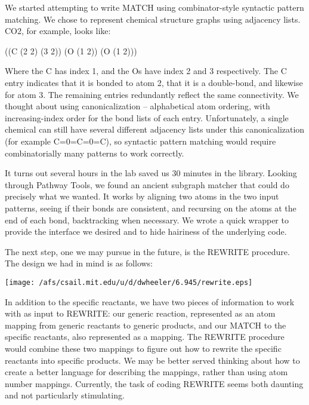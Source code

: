We started attempting to write MATCH using combinator-style syntactic
pattern matching. We chose to represent chemical structure graphs
using adjacency lists. CO2, for example, looks like:

((C (2 2) (3 2)) 
 (O (1 2)) 
 (O (1 2))) 

 Where the C has index 1, and the Os have index 2 and 3 respectively. The C
 entry indicates that it is bonded to atom 2, that it is a double-bond, and
 likewise for atom 3. The remaining entries redundantly reflect the same
 connectivity.  We thought about using canonicalization -- alphabetical
 atom ordering, with increasing-index order for the bond lists of each
 entry. Unfortunately, a single chemical can still have several different
 adjacency lists under this canonicalization (for example C=0=C=0=C), so
 syntactic pattern matching would require combinatorially many patterns to
 work correctly.

It turns out several hours in the lab saved us 30 minutes in the library.
Looking through Pathway Tools, we found an ancient subgraph matcher
that could do precisely what we wanted. It works by aligning two atoms
in the two input patterns, seeing if their bonds are consistent, and
recursing on the atoms at the end of each bond, backtracking when
necessary. We wrote a quick wrapper to provide the interface we desired
and to hide hairiness of the underlying code.

The next step, one we may pursue in the future, is the REWRITE procedure.
The design we had in mind is as follows:

\vspace{.1in}

\begin{center}\texttt{[image: /afs/csail.mit.edu/u/d/dwheeler/6.945/rewrite.eps]}\end{center}

\vspace{.1in}

In addition to the specific reactants, we have two pieces of information
to work with as input to REWRITE: our generic reaction, represented
as an atom mapping from generic reactants to generic products, and
our MATCH to the specific reactants, also represented as a mapping.
The REWRITE procedure would combine these two mappings to figure out
how to rewrite the specific reactants into specific products. We may
be better served thinking about how to create a better language for
describing the mappings, rather than using atom number mappings. Currently,
the task of coding REWRITE seems both daunting and not particularly
stimulating. 

